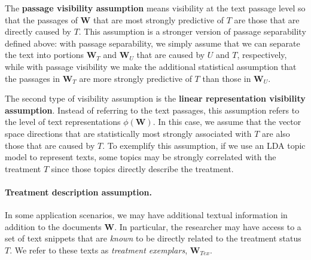 \documentclass[11pt]{article}
\newcommand{\bW}{\bm{W}}  %
\begin{document}
The \textbf{passage visibility assumption} means visibility at the text passage level so that the passages of $\bW$ that are most strongly predictive of $T$ are those that are directly caused by $T$. This assumption is a stronger version of passage separability defined above: with passage separability, we simply assume that we can separate the text into portions $\bW_T$ and $\bW_U$ that are caused by $U$ and $T$, respectively, while with passage visibility we make the additional statistical assumption that the passages in $\bW_T$ are more strongly predictive of $T$ than those in $\bW_U$.

The second type of visibility assumption is the \textbf{linear representation visibility assumption}. Instead of referring to the text passages, this assumption refers to the level of text representations $\phi(\bW)$. In this case, we assume that the vector space directions that are statistically most strongly associated with $T$ are also those that are caused by $T$.
%
To exemplify this assumption, if we use an LDA topic model to represent texts, some topics may be strongly correlated with the treatment $T$ since those topics directly describe the treatment.

%


\paragraph{Treatment description assumption.}

In some application scenarios, we may have additional textual information in addition to the documents $\bW$. In particular, the researcher may have access to a set of text snippets that are \emph{known} to be directly related to the treatment status $T$. We refer to these texts as \emph{treatment exemplars}, $\bW_{Tex}$.
\end{document}
